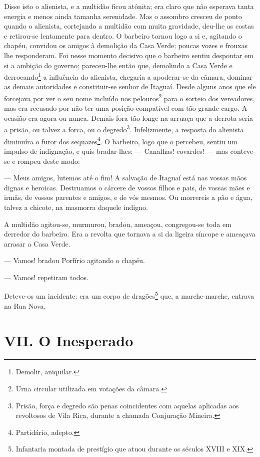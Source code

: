 Disse isto o alienista, e a multidão ficou atônita; era claro que não
esperava tanta energia e menos ainda tamanha serenidade. Mas o assombro
cresceu de ponto quando o alienista, cortejando a multidão com muita
gravidade, deu-lhe as costas e retirou-se lentamente para dentro. O
barbeiro tornou logo a si e, agitando o chapéu, convidou os amigos à
demolição da Casa Verde; poucas vozes e frouxas lhe responderam. Foi
nesse momento decisivo que o barbeiro sentiu despontar em si a ambição
do governo; pareceu-lhe então que, demolindo a Casa Verde e
derrocando\footnote{Demolir, aniquilar.} a influência do alienista,
chegaria a apoderar-se da câmara, dominar as demais autoridades e
constituir-se senhor de Itaguaí. Desde alguns anos que ele forcejava por
ver o seu nome incluído nos pelouros\footnote{Urna circular utilizada em
  votações da câmara.} para o sorteio dos vereadores, mas era recusado
por não ter uma posição compatível com tão grande cargo. A ocasião era
agora ou nunca. Demais fora tão longe na arruaça que a derrota seria a
prisão, ou talvez a forca, ou o degredo\footnote{Prisão, força e degredo
  são penas coincidentes com aquelas aplicadas aos revoltosos de Vila
  Rica, durante a chamada Conjuração Mineira.}. Infelizmente, a resposta
do alienista diminuíra o furor dos sequazes\footnote{Partidário, adepto.}.
O barbeiro, logo que o percebeu, sentiu um impulso de indignação, e quis
bradar-lhes: --- Canalhas! covardes! --- mas conteve-se e rompeu deste
modo:

--- Meus amigos, lutemos até o fim! A salvação de Itaguaí está nas
vossas mãos dignas e heroicas. Destruamos o cárcere de vossos filhos e
pais, de vossas mães e irmãs, de vossos parentes e amigos, e de vós
mesmos. Ou morrereis a pão e água, talvez a chicote, na masmorra daquele
indigno.

A multidão agitou-se, murmurou, bradou, ameaçou, congregou-se toda em
derredor do barbeiro. Era a revolta que tornava a si da ligeira síncope
e ameaçava arrasar a Casa Verde.

--- Vamos! bradou Porfírio agitando o chapéu.

--- Vamos! repetiram todos.

Deteve-os um incidente: era um corpo de dragões\footnote{Infantaria
  montada de prestígio que atuou durante os séculos XVIII e XIX.} que, a
marche-marche, entrava na Rua Nova.

\chapter{VII. O Inesperado}

